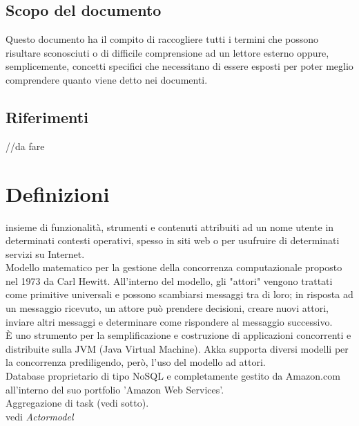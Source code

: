 \documentclass{scalatekids-article}
\begin{document}
\subsection{Scopo del documento}
Questo documento ha il compito di raccogliere tutti i termini che possono risultare sconosciuti o di difficile comprensione ad un lettore esterno oppure, semplicemente, concetti specifici che necessitano di essere esposti per poter meglio comprendere quanto viene detto nei documenti.
\subsection{Riferimenti} //da fare
\newpage
\section{Definizioni}


 insieme di funzionalità, strumenti e contenuti attribuiti ad un nome utente in determinati contesti operativi, spesso in siti web o per usufruire di determinati servizi su Internet.
\\

 Modello matematico per la gestione della concorrenza computazionale proposto nel 1973 da Carl Hewitt.
All'interno del modello, gli "attori" vengono trattati come primitive universali e possono scambiarsi messaggi tra di loro; in risposta ad un messaggio ricevuto, un attore può prendere decisioni, creare nuovi attori, inviare altri messaggi e determinare come rispondere al messaggio successivo.
\\

 È uno strumento per la semplificazione e costruzione di applicazioni concorrenti e distribuite sulla JVM (Java Virtual Machine). Akka supporta diversi modelli per la concorrenza prediligendo, però, l'uso del modello ad attori.
\\

 Database proprietario di tipo NoSQL e completamente gestito da Amazon.com all'interno del suo portfolio 'Amazon Web Services'.
\\

 Aggregazione di task (vedi sotto).
\\

  vedi \textit{Actormodel}
\\

\end{document}
